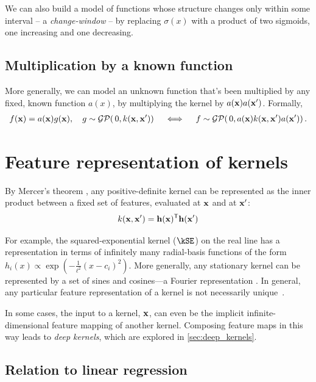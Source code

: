 We can also build a model of functions whose structure changes only within some interval -- a \emph{change-window} -- by replacing $\sigma(x)$ with a product of two sigmoids, one increasing and one decreasing.

\subsection{Multiplication by a known function}

More generally, we can model an unknown function that's been multiplied by any fixed, known function $a(x)$, by multiplying the kernel by $a({\bf{x}}) a({\bf{x}}')$.
Formally,
%
\begin{align}
f({\bf{x}}) = a({\bf{x}}) g({\bf{x}}), \quad g \sim \mathcal{GP}\!\left(\, 0, k({\bf{x}}, {\bf{x}}') \right) \quad
\iff
\quad f \sim \mathcal{GP}\!\left(\, 0,  a({\bf{x}}) k({\bf{x}}, {\bf{x}}') a({\bf{x}}') \right) .
\end{align}




\section{Feature representation of kernels}
\label{sec:mercer}
%
By Mercer's theorem \citep{mercer1909functions},
any positive-definite kernel can be represented as the inner product between a fixed set of features, evaluated at ${\bf{x}}$ and at ${\bf{x}}'$:
%
\begin{align}
k({\bf{x}}, {\bf{x}}') = {\bf{h}}({\bf{x}})^{\mathsf{T}} {\bf{h}}({\bf{x}}')
\end{align}

For example, the squared-exponential kernel ($\kSE$) on the real line has a representation in terms of infinitely many radial-basis functions of the form ${h_i(x) \propto \exp( -\frac{1}{\ell^2} (x - c_i)^2)}$.
More generally, any stationary kernel can be represented by a set of sines and cosines---a Fourier representation \citep{bochner1959lectures}.
In general, any particular feature representation of a kernel is not necessarily unique~\citep{minh2006mercer}.

In some cases, the input to a kernel, ${\bf{x}}$, can even be the implicit infinite-dimensional feature mapping of another kernel.
Composing feature maps in this way leads to \emph{deep kernels}, which are explored in \cref{sec:deep_kernels}.



\subsection{Relation to linear regression}

